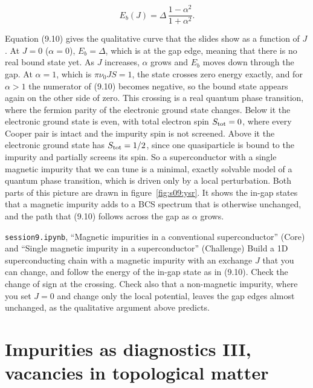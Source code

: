 \begin{equation}
E_b(J) = \Delta\, \frac{1-\alpha^2}{1+\alpha^2}.
\end{equation}

Equation (9.10) gives the qualitative curve that the slides show as a function of $J$. At
$J=0$ ($\alpha=0$), $E_b = \Delta$, which is at the gap edge, meaning that there is no real bound
state yet. As $J$ increases, $\alpha$ grows and $E_b$ moves down through the gap. At $\alpha = 1$,
which is $\pi\nu_0 J S = 1$, the state crosses zero energy exactly, and for $\alpha>1$ the numerator
of (9.10) becomes negative, so the bound state appears again on the other side of zero. This crossing
is a real quantum phase transition, where the fermion parity of the electronic ground state changes.
Below it the electronic ground state is even, with total electron spin $S_{\rm
tot}=0$, where every Cooper pair is intact and the impurity spin is not screened. Above it the
electronic ground state has $S_{\rm tot}=1/2$, since one quasiparticle is bound to the impurity
and partially screens its spin. So a superconductor with a single magnetic impurity that we can tune is a minimal,
exactly solvable model of a quantum phase transition, which is driven only by a local perturbation.
Both parts of this picture are drawn in figure~\ref{fig:s09:ysr}. It shows the in-gap states that a
magnetic impurity adds to a BCS spectrum that is otherwise unchanged, and the path that (9.10)
follows across the gap as $\alpha$ grows.



\begin{notebookbox}{\texttt{session9.ipynb}, ``Magnetic impurities in a conventional superconductor'' (Core) and ``Single magnetic impurity in a superconductor'' (Challenge)}
Build a 1D superconducting chain with a magnetic impurity with an exchange $J$ that you can change,
and follow the energy of the in-gap state as in (9.10). Check the change of sign at the crossing.
Check also that a non-magnetic impurity, where you set $J=0$ and change only the local potential,
leaves the gap edges almost unchanged, as the qualitative argument above predicts.
\end{notebookbox}

\section{Impurities as diagnostics III, vacancies in topological matter}


